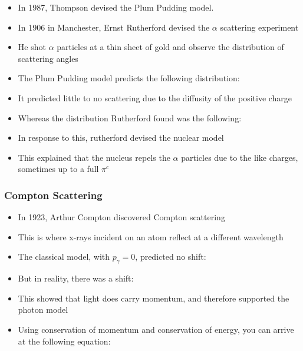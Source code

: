 \documentclass{article}
\begin{document}
\begin{itemize}
    \item In 1987, Thompson devised the Plum Pudding model.
    \item In 1906 in Manchester, Ernst Rutherford devised the \(\alpha\) scattering experiment
    \item He shot \(\alpha\) particles at a thin sheet of gold and observe the distribution of scattering angles
    \item The Plum Pudding model predicts the following distribution:
    \item It predicted little to no scattering due to the diffusity of the positive charge
    \item Whereas the distribution Rutherford found was the following:
    \item In response to this, rutherford devised the nuclear model
    \item This explained that the nucleus repels the $\alpha$ particles due to the like charges, sometimes up to a full $\pi^c$
\end{itemize}

\subsubsection*{Compton Scattering}

\begin{itemize}
    \item In 1923, Arthur Compton discovered Compton scattering
    \item This is where x-rays incident on an atom reflect at a different wavelength
    \item The classical model, with \(p_\gamma = 0\), predicted no shift:
    \item But in reality, there was a shift:
    \item This showed that light does carry momentum, and therefore supported the photon model
    \item Using conservation of momentum and conservation of energy, you can arrive at the following equation:
    

\end{itemize}
\end{document}
